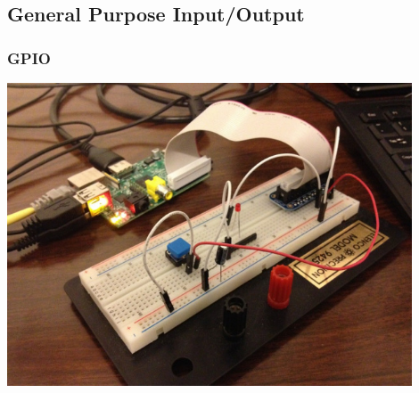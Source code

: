 \subsection{General Purpose Input/Output}

\begin{frame}
  \frametitle{GPIO}
  \begin{center}
    \includegraphics[width=0.9\textwidth]{slides/te5009-embedded-architecture-pins/GPIO_setup.jpg}\\
  \end{center}
\end{frame}

